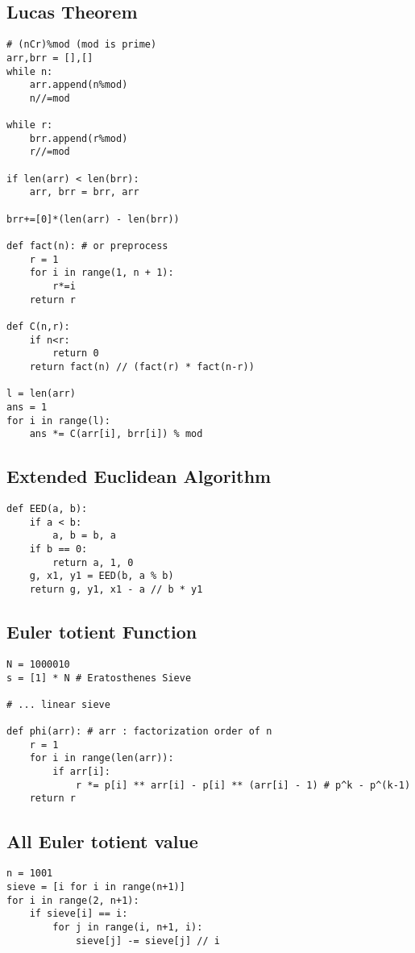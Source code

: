 \documentclass[landscape, 8pt, a4paper, oneside, twocolumn]{extarticle}
\begin{document}
\subsection{Lucas Theorem}
\begin{verbatim}
# (nCr)%mod (mod is prime)
arr,brr = [],[]
while n:
    arr.append(n%mod)
    n//=mod

while r:
    brr.append(r%mod)
    r//=mod

if len(arr) < len(brr):
    arr, brr = brr, arr

brr+=[0]*(len(arr) - len(brr))

def fact(n): # or preprocess
    r = 1
    for i in range(1, n + 1):
        r*=i
    return r

def C(n,r):
    if n<r:
        return 0
    return fact(n) // (fact(r) * fact(n-r))

l = len(arr)
ans = 1
for i in range(l):
    ans *= C(arr[i], brr[i]) % mod
\end{verbatim}
\subsection{Extended Euclidean Algorithm}
\begin{verbatim}
def EED(a, b):
    if a < b:
        a, b = b, a
    if b == 0:
        return a, 1, 0
    g, x1, y1 = EED(b, a % b)
    return g, y1, x1 - a // b * y1
\end{verbatim}
\subsection{Euler totient Function}
\begin{verbatim}
N = 1000010
s = [1] * N # Eratosthenes Sieve

# ... linear sieve

def phi(arr): # arr : factorization order of n
    r = 1
    for i in range(len(arr)):
        if arr[i]:
            r *= p[i] ** arr[i] - p[i] ** (arr[i] - 1) # p^k - p^(k-1)
    return r
\end{verbatim}
\subsection{All Euler totient value}
\begin{verbatim}
n = 1001
sieve = [i for i in range(n+1)]
for i in range(2, n+1):
    if sieve[i] == i:
        for j in range(i, n+1, i):
            sieve[j] -= sieve[j] // i
\end{verbatim}
\end{document}
